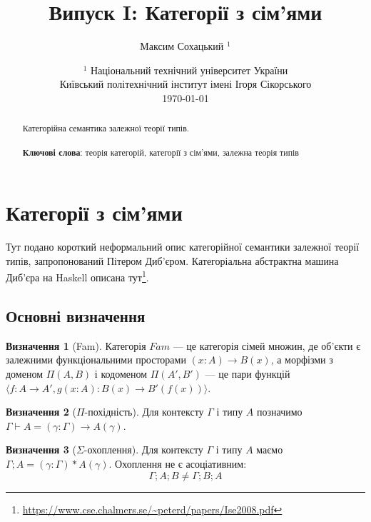 \documentclass{article}
\theoremstyle{definition}
\newtheorem{definition}{Визначення}[section]
\begin{document}
\title{Випуск I: Категорії з сім'ями}
\author{Максим Сохацький $^1$}
\date{ $^1$ Національний технічний університет України \\
       \small Київський політехнічний інститут імені Ігоря Сікорського \\
       \today }

\maketitle

\begin{abstract}

Категорійна семантика залежної теорії типів. \\
\\
{\bf Ключові слова}: теорія категорій, категорії з сім'ями, залежна теорія типів
\end{abstract}
\tableofcontents

\newpage
\section{Категорії з сім'ями}

Тут подано короткий неформальний опис категорійної семантики залежної теорії типів, запропонований Пітером Диб’єром.
Категоріальна абстрактна машина Диб'єра на Haskell описана тут\footnote{\url{https://www.cse.chalmers.se/~peterd/papers/Ise2008.pdf}}.

\subsection{Основні визначення}

\begin{definition}[Fam]
Категорія $Fam$ --- це категорія сімей множин, де об’єкти є залежними функціональними просторами $(x:A)\rightarrow B(x)$, а морфізми з доменом $\Pi(A,B)$ і кодоменом $\Pi(A',B')$ --- це пари функцій $\langle f:A\rightarrow A', g(x:A):B(x)\rightarrow B'(f(x)) \rangle$.
\end{definition}

\begin{definition}[$\Pi$-похідність]
Для контексту $\Gamma$ і типу $A$ позначимо $\Gamma\vdash A = (\gamma:\Gamma)\rightarrow A(\gamma)$.
\end{definition}

\begin{definition}[$\Sigma$-охоплення]
Для контексту $\Gamma$ і типу $A$ маємо $\Gamma;A = (\gamma:\Gamma)*A(\gamma)$. Охоплення не є асоціативним:
\[
    \Gamma;A;B \neq \Gamma;B;A
\]
\end{definition}
\end{document}
